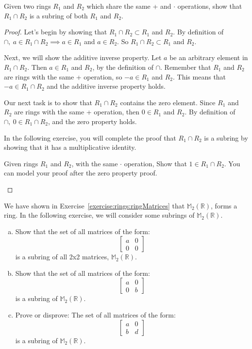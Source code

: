 \begin{example}
Given two rings $R_1$ and $R_2$ which share the same + and $\cdot$ operations, show that $R_1 \cap R_2$ is a subring of both $R_1$ and $R_2$.

\begin{proof}
Let's begin by showing that $R_1 \cap R_2\subset R_1$ and $R_2$.  By definition of $\cap, ~a\in R_1\cap R_2\implies a\in R_1$ and $a\in R_2$. So  $R_1 \cap R_2\subset R_1$ and $R_2$. 

Next, we will show the additive inverse property. Let $a$ be an arbitrary element in $R_1 \cap R_2$. Then $a\in R_1$ and $R_2$, by the definition of $\cap$. Remember that $R_1$ and $R_2$ are rings with the same + operation, so $-a\in R_1$ and $R_2$.  This means that $-a\in R_1 \cap R_2$ and the additive inverse property holds.

Our next task is to show that $R_1 \cap R_2$ contains the zero element. Since $R_1$ and $R_2$ are rings with the same + operation, then $0\in R_1$ and $R_2$.  By definition of $\cap, ~0\in R_1 \cap R_2$, and the zero property holds.

In the following exercise, you will complete the proof that $R_1\cap R_2$ is a subring by showing that it has a multiplicative identity.

\begin{exercise}
Given rings $R_1$ and $R_2$, with the same $\cdot$ operation, Show that $1\in R_1 \cap R_2$. You can model your proof after the zero property proof.
\end{exercise}
\end{proof}
\end{example}
We have shown in Exercise~\ref{exercise:rings:ringMatrices} that ${\mathbb M}_2({\mathbb R})$, forms a ring.  In the following exercise, we will consider some subrings of ${\mathbb M}_2({\mathbb R})$.


\begin{exercise}
\begin{enumerate}[(a)]
\item
Show that the set of all matrices of the form:
$$
\begin{bmatrix}
a & 0\\
0 & 0
\end{bmatrix}
$$
is a subring of all 2x2 matrices, ${\mathbb M}_2({\mathbb R})$.
\item
Show that the set of all matrices of the form:
$$
\begin{bmatrix}
a & 0\\
0 & b
\end{bmatrix}
$$
is a subring of ${\mathbb M}_2({\mathbb R})$.
\item
Prove or disprove: The set of all matrices of the form:
$$
\begin{bmatrix}
a & 0\\
b & d
\end{bmatrix}
$$
is a subring of  ${\mathbb M}_2({\mathbb R})$.
\end{enumerate}
\end{exercise}

